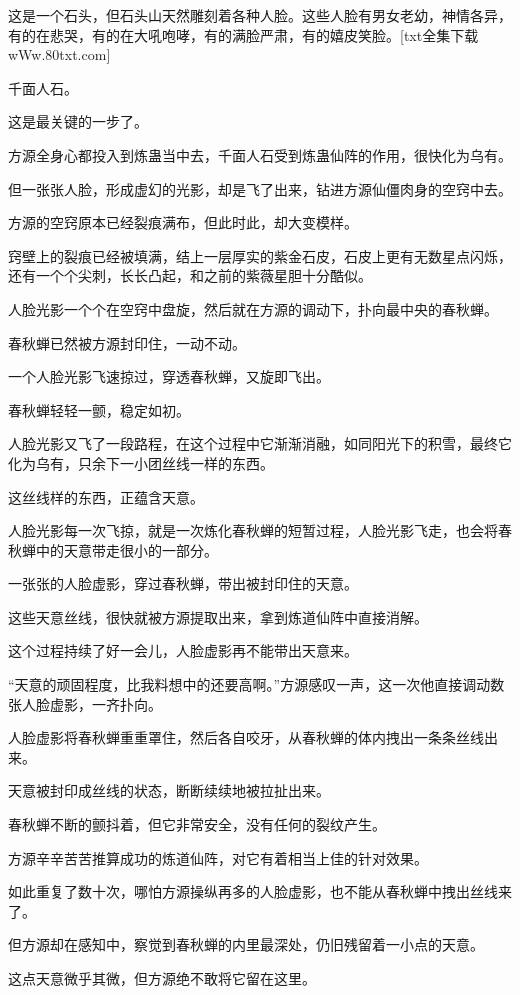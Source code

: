 \begin{this_body}
这是一个石头，但石头山天然雕刻着各种人脸。这些人脸有男女老幼，神情各异，有的在悲哭，有的在大吼咆哮，有的满脸严肃，有的嬉皮笑脸。[txt全集下载wWw.80txt.com]

千面人石。

这是最关键的一步了。

方源全身心都投入到炼蛊当中去，千面人石受到炼蛊仙阵的作用，很快化为乌有。

但一张张人脸，形成虚幻的光影，却是飞了出来，钻进方源仙僵肉身的空窍中去。

方源的空窍原本已经裂痕满布，但此时此，却大变模样。

窍壁上的裂痕已经被填满，结上一层厚实的紫金石皮，石皮上更有无数星点闪烁，还有一个个尖刺，长长凸起，和之前的紫薇星胆十分酷似。

人脸光影一个个在空窍中盘旋，然后就在方源的调动下，扑向最中央的春秋蝉。

春秋蝉已然被方源封印住，一动不动。

一个人脸光影飞速掠过，穿透春秋蝉，又旋即飞出。

春秋蝉轻轻一颤，稳定如初。

人脸光影又飞了一段路程，在这个过程中它渐渐消融，如同阳光下的积雪，最终它化为乌有，只余下一小团丝线一样的东西。

这丝线样的东西，正蕴含天意。

人脸光影每一次飞掠，就是一次炼化春秋蝉的短暂过程，人脸光影飞走，也会将春秋蝉中的天意带走很小的一部分。

一张张的人脸虚影，穿过春秋蝉，带出被封印住的天意。

这些天意丝线，很快就被方源提取出来，拿到炼道仙阵中直接消解。

这个过程持续了好一会儿，人脸虚影再不能带出天意来。

“天意的顽固程度，比我料想中的还要高啊。”方源感叹一声，这一次他直接调动数张人脸虚影，一齐扑向。

人脸虚影将春秋蝉重重罩住，然后各自咬牙，从春秋蝉的体内拽出一条条丝线出来。

天意被封印成丝线的状态，断断续续地被拉扯出来。

春秋蝉不断的颤抖着，但它非常安全，没有任何的裂纹产生。

方源辛辛苦苦推算成功的炼道仙阵，对它有着相当上佳的针对效果。

如此重复了数十次，哪怕方源操纵再多的人脸虚影，也不能从春秋蝉中拽出丝线来了。

但方源却在感知中，察觉到春秋蝉的内里最深处，仍旧残留着一小点的天意。

这点天意微乎其微，但方源绝不敢将它留在这里。


\end{this_body}
